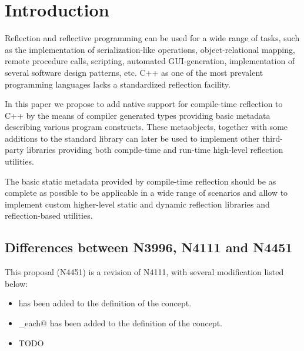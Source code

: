 \section{Introduction}

Reflection and reflective programming can be used
for a wide range of tasks, such as the implementation
of serialization-like operations, object-relational mapping,
remote procedure calls, scripting, automated GUI-generation,
implementation of several software design patterns, etc.
C++ as one of the most prevalent programming languages 
lacks a standardized reflection facility.

In this paper we propose to add native support for
compile-time reflection to C++ by the means of compiler generated
types providing basic metadata describing various program constructs.
These metaobjects, together with some additions to the standard
library can later be used to implement other third-party libraries
providing both compile-time and run-time high-level
reflection utilities.

The basic static metadata provided by compile-time reflection
should be as complete as possible to be applicable in a wide
range of scenarios and allow to implement custom higher-level
static and dynamic reflection libraries and reflection-based
utilities.

\subsection{Differences between N3996, N4111 and N4451}

This proposal (N4451) is a revision of N4111, with several modification
listed below:

\begin{itemize}
\item \verb@position@ has been added to the definition of the  concept.
\item \verb@for_each@ has been added to the definition of the  concept.
\item TODO
\end{itemize}
